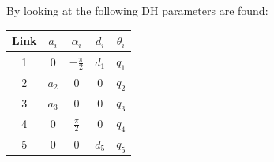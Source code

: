 By looking at  the following DH parameters are found:
\begin{center}
    \begin{tabular}{|c|c|c|c|c|}
         \hline
         Link & $a_i$ & $\alpha_i$ & $d_i$ & $\theta_i$ \\ \hline
         1 & 0 & $-\frac{\pi}{2}$ & $d_1$ & $q_1$ \\
         2 & $a_2$ & 0 & 0 & $q_2$ \\ 
         3 & $a_3$ & 0 & 0 & $q_3$\\
         4 & 0 & $\frac{\pi}{2}$ & 0 & $q_4$\\
         5 & 0 & 0 & $d_5$ & $q_5$\\
         \hline
    \end{tabular}
\end{center}


